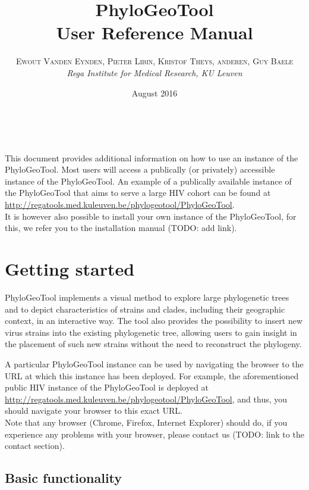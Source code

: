\documentclass[a4paper, 11pt]{article} %
\title{\textbf{PhyloGeoTool}\\ %
User Reference Manual} %
\author{\textsc{Ewout Vanden Eynden, Pieter Libin, Kristof Theys, anderen, Guy Baele} %
\\{\textit{Rega Institute for Medical Research, KU Leuven}}} %
\date{August 2016} %
\makeatletter
\renewcommand{\maketitle}{ %
\begin{flushright} %
{\LARGE\@title} %

\vspace{50pt} %

{\large\@author} %
\\\@date %

\vspace{40pt} %
\end{flushright}
}
\makeatother
\begin{document}
\maketitle %

\vspace{30pt} %

\tableofcontents
\newpage

This document provides additional information on how to use an instance of the PhyloGeoTool. Most users will access a publically (or privately) accessible instance of the PhyloGeoTool. An example of a publically available instance of the PhyloGeoTool that aims to serve a large HIV cohort can be found at \url{http://regatools.med.kuleuven.be/phylogeotool/PhyloGeoTool}.\\
It is however also possible to install your own instance of the PhyloGeoTool, for this, we refer you to the installation manual (TODO: add link).

\section{Getting started}

PhyloGeoTool implements a visual method to explore large phylogenetic trees and to depict characteristics of strains and clades, including their geographic context, in an interactive way.
The tool also provides the possibility to insert new virus strains into the existing phylogenetic tree, allowing users to gain insight in the placement of such new strains without the need to reconstruct the phylogeny.

A particular PhyloGeoTool instance can be used by navigating the browser to the URL at which this instance has been deployed. For example, the aforementioned public HIV instance of the PhyloGeoTool is deployed at \url{http://regatools.med.kuleuven.be/phylogeotool/PhyloGeoTool}, and thus, you should navigate your browser to this exact URL.\\
Note that any browser (Chrome, Firefox, Internet Explorer) should do, if you experience any problems with your browser, please contact us (TODO: link to the contact section).


\subsection{Basic functionality}
\end{document}
